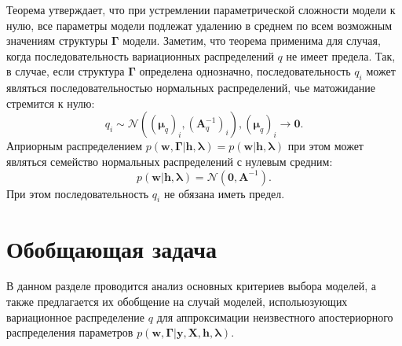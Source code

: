Теорема утверждает, что при устремлении параметрической сложности модели к нулю, все параметры модели подлежат удалению в среднем по всем возможным значениям  структуры $\boldsymbol{\Gamma}$ модели. Заметим, что теорема применима для случая, когда последовательность вариационных распределений $q$ не имеет предела. Так, в случае, если структура $\boldsymbol{\Gamma}$ определена однозначно, последовательность $q_i$ может являться последовательностью нормальных распределений, чье матожидание стремится к нулю:
\[
    q_i \sim \mathcal{N}((\boldsymbol{\mu}_q)_i, (\mathbf{A}^{-1}_q)_i), (\boldsymbol{\mu}_q)_i \to \mathbf{0}.
\]
Априорным распределением $p(\mathbf{w},\boldsymbol{\Gamma}|\mathbf{h},\boldsymbol{\lambda}) = p(\mathbf{w}|\mathbf{h},\boldsymbol{\lambda})$ при этом может являться семейство нормальных распределений с нулевым средним:
\[
    p(\mathbf{w}|\mathbf{h},\boldsymbol{\lambda}) = \mathcal{N}(\mathbf{0}, \mathbf{A}^{-1}).
\]
При этом последовательность $q_i$ не обязана иметь предел.

\section{Обобщающая задача}
В данном разделе проводится анализ основных критериев выбора моделей, а также предлагается их обобщение на случай моделей, испольюзующих вариационное распределение $q$ для аппроксимации неизвестного апостериорного распределения параметров $p(\mathbf{w}, \boldsymbol{\Gamma}|\mathbf{y}, \mathbf{X}, \mathbf{h}, \boldsymbol{\lambda})$.

